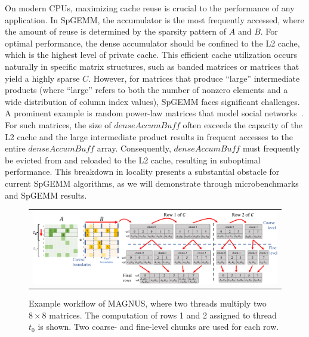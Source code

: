 \sloppy On modern CPUs, maximizing cache reuse is crucial to the performance of any application.
In SpGEMM, the accumulator is the most frequently accessed, where the amount of reuse is determined by the sparsity pattern of $A$ and $B$.
For optimal performance, the dense accumulator should be confined to the L2 cache, which is the highest level of private cache.
This efficient cache utilization occurs naturally in specific matrix structures, such as banded matrices or matrices that yield a highly sparse $C$. However, for matrices that produce ``large'' intermediate products (where ``large'' refers to both the number of nonzero elements and a wide distribution of column index values), SpGEMM faces significant challenges. A prominent example is random power-law matrices that model social networks~\cite{rmat}. For such matrices, the size of $denseAccumBuff$ often exceeds the capacity of the L2 cache and the large intermediate product results in frequent accesses to the entire $denseAccumBuff$ array. Consequently, $denseAccumBuff$ must frequently be evicted from and reloaded to the L2 cache, resulting in suboptimal performance. This breakdown in locality presents a substantial obstacle for current SpGEMM algorithms, as we will demonstrate through microbenchmarks and SpGEMM results.

\begin{figure}[th]
\centering
\begin{tabular}{c}
\includegraphics[width=\linewidth]{figs/MAGNUS_example_horizontal.pdf} 
\end{tabular}
\caption{Example workflow of MAGNUS, where two threads multiply two $8\times8$ matrices.
The computation of rows 1 and 2 assigned to thread $t_0$ is shown.
Two coarse- and fine-level chunks are used for each row.
}
\label{fig:MAGNUS_example}
\end{figure}

